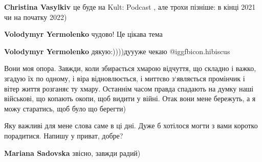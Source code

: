 \begin{itemize}
\begin{itemize} %
\textbf{Christina Vasylkiv} це буде на Kult: Podcast , але трохи пізніше: в кінці 2021 чи на початку 2022)

\textbf{Volodymyr Yermolenko} чудово! Це цікава тема

\textbf{Volodymyr Yermolenko} дякую:))))дуууже чекаю @igg{fbicon.hibiscus} 
\end{itemize} %


Вони моя опора. Завжди, коли збирається хмарою відчуття, що складно і важко,
згадую їх по одному, і віра відновлюється, і миттєво з‘являється промінчик і
вітер життя розганяє ту хмару. Останнім часом правда спадають на думку наші
військові, що копають окопи, щоб видити у війні. Отак вони мене бережуть, а я
можу старатись, щоб було що берегти)


Яку важливі для мене слова саме в ці дні. Дуже б хотілося могти з вами коротко
порадитися. Напишу у приват, добре?

\begin{itemize} %
\textbf{Mariana Sadovska} звісно, завжди радий)
\end{itemize} %

\end{itemize} %
